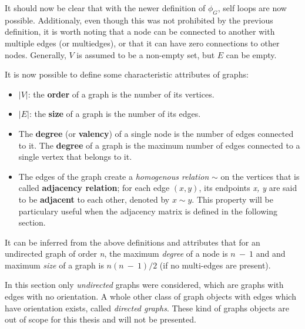 \begin{definition}
It should now be clear that with the newer definition of $\phi_G$, self loops are now possible.
Additionaly, even though this was not prohibited by the previous definition, it is worth
noting that a node can be connected to another with multiple edges (or multiedges), or that it can have zero
connections to other nodes. Generally, $V$ is assumed to be a non-empty set, but $E$ can be
empty.

It is now possible to define some characteristic attributes of graphs:
\begin{itemize}
\item $|V|$: the \textbf{order} of a graph is the number of its vertices.
\item $|E|$: the \textbf{size} of a graph is the number of its edges.
\item The \textbf{degree} (or \textbf{valency}) of a single node is the number of
  edges connected to it. The \textbf{degree} of a graph is the maximum number of
  edges connected to a single vertex that belongs to it.
\item The edges of the graph create a \textit{homogenous
relation}\footnotemark{} $\sim$ on the vertices that is called
\textbf{adjacency relation}; for each edge \textit{$(x, y)$}, its
endpoints \textit{x, y} are said to be \textbf{adjacent} to each
other, denoted by $x \sim y$.  This property will be particulary
useful when the adjacency matrix is defined in the following
  section.
\end{itemize}


It can be inferred from the above definitions and attributes that for an undirected
graph of order \textit{n}, the maximum \textit{degree} of a node is $n~-~1$ and
and maximum \textit{size} of a graph is $n(n~-~1)/2$ (if no multi-edges are present).

\end{definition}

In this section only \textit{undirected} graphs were considered, which are graphs
with edges with no orientation. A whole other class of graph objects with edges which
have orientation exists, called \textit{directed graphs}. These kind of graphs objects
are out of scope for this thesis and will not be presented.


